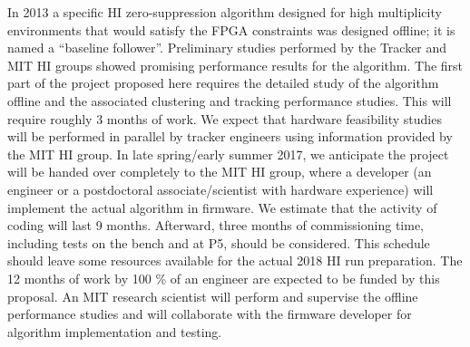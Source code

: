 In 2013 a specific HI zero-suppression algorithm designed for high multiplicity environments that would satisfy the FPGA constraints was designed offline; it is named a ``baseline follower''.  Preliminary studies performed by the Tracker and MIT HI groups showed promising performance results for the algorithm. The first part of the project proposed here requires the detailed study of the algorithm offline and the associated  clustering and tracking performance studies. This will require roughly 3 months of work. We expect that hardware feasibility studies will be performed in parallel by tracker engineers using information provided by the MIT HI group. In late spring/early summer 2017, we anticipate the project will be handed over completely to the MIT HI group, where a developer (an engineer or a postdoctoral associate/scientist with hardware experience) will implement the actual algorithm in firmware. We estimate that the activity of coding will last 9 months. Afterward, three months of commissioning time, including tests on the bench and at P5, should be considered. This schedule should leave some resources available for the actual 2018 HI run preparation. The 12 months of work by 100 \% of an engineer are expected to be funded by this proposal. %
An MIT research scientist will perform and supervise the offline performance studies and will collaborate with the firmware developer for algorithm implementation and testing.  


